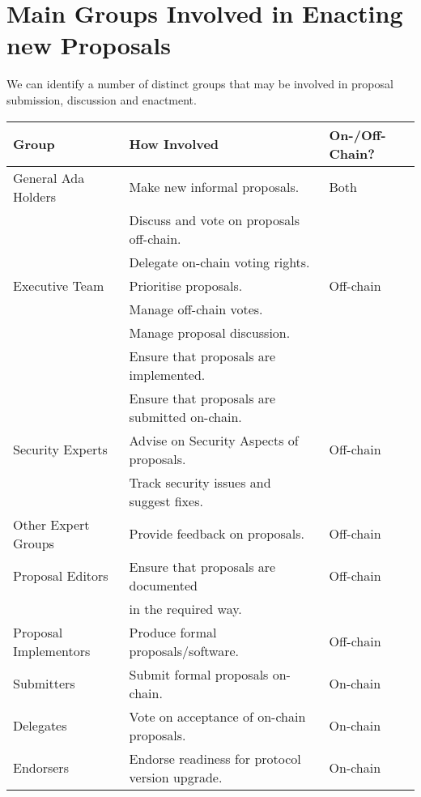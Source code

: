 \pagebreak
\section{Main Groups Involved in Enacting new Proposals}
\label{sect:groups}

We can identify a number of distinct groups that may be involved in proposal submission, discussion and enactment.

\vspace{1em}
\begin{tabular}{||l|l|l||}
  \hline \hline
  \textbf{Group} & \textbf{How Involved} & \textbf{On-/Off-Chain?}\\
  \hline
  General Ada Holders  & Make new informal proposals. & Both \\
                       & Discuss and vote on proposals off-chain. & \\
  			               & Delegate on-chain voting rights. & \\
  \hline
  Executive Team  & Prioritise proposals. & Off-chain \\
                       & Manage off-chain votes. & \\
                       & Manage proposal discussion. & \\
  			               & Ensure that proposals are implemented. & \\
  			               & Ensure that proposals are submitted on-chain. & \\
  \hline
  Security Experts			       & Advise on Security Aspects of proposals. & Off-chain \\
                               & Track security issues and suggest fixes. & \\
  \hline
  Other Expert Groups			       & Provide feedback on proposals. & Off-chain \\
  \hline
  Proposal Editors			   & Ensure that proposals are documented & Off-chain \\
                     & in the required way. &  \\
  \hline
  Proposal Implementors			   & Produce formal proposals/software. & Off-chain\\
  \hline
  Submitters				   & Submit formal proposals on-chain. & On-chain \\
  \hline
  Delegates				   & Vote on acceptance of on-chain proposals. & On-chain \\
  \hline
  Endorsers			   & Endorse readiness for protocol version upgrade. & On-chain\\
  \hline \hline
\end{tabular}

